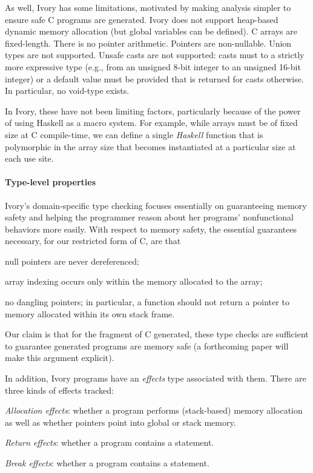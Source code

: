 As well, Ivory has some limitations, motivated by making analysis simpler to
ensure safe C programs are generated.  Ivory does not support heap-based dynamic
memory allocation (but global variables can be defined).  C arrays are
fixed-length.  There is no pointer arithmetic.  Pointers are non-nullable.
Union types are not supported.  Unsafe casts are not supported: casts must to a
strictly more expressive type (e.g., from an unsigned 8-bit integer to an
unsigned 16-bit integer) or a default value must be provided that is returned
for casts otherwise.  In particular, no void-type exists.

In Ivory, these have not been limiting factors, particularly because of the
power of using Haskell as a macro system.  For example, while arrays must be of
fixed size at C compile-time, we can define a single \emph{Haskell} function
that is polymorphic in the array size that becomes instantiated at a particular
size at each use site.  %


\paragraph{Type-level properties}
Ivory's domain-specific type checking focuses essentially on guaranteeing memory
safety and helping the programmer reason about her programs' nonfunctional
behaviors more easily.  With respect to memory safety, the essential
guarantees necessary, for our restricted form of C, are that
\begin{compactitem}
  \item null pointers are never dereferenced;
  \item array indexing occurs only within the memory allocated to
    the array;
  \item no dangling pointers; in particular, a function should not return a
    pointer to memory allocated within its own stack frame.
\end{compactitem}

\noindent
Our claim is that for the fragment of C generated, these type checks are
sufficient to guarantee generated programs are memory safe (a forthcoming paper
will make this argument explicit).

In addition, Ivory programs have an \emph{effects} type associated with them.
There are three kinds of effects tracked:
\begin{compactitem}
  \item \emph{Allocation effects}: whether a program performs (stack-based)
    memory allocation as well as whether pointers point into global or stack memory.
  \item \emph{Return effects}: whether a program contains a  statement.
  \item \emph{Break effects}: whether a program contains a 
    statement.
\end{compactitem}

